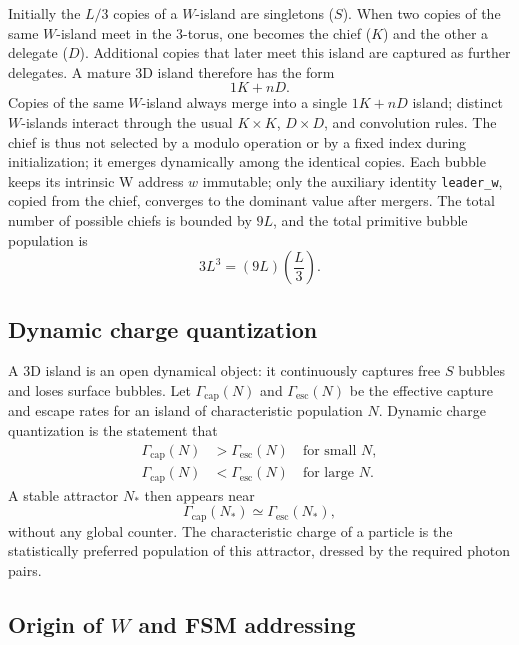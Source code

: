 \documentclass{ijuc}
\begin{document}
Initially the $L/3$ copies of a $W$-island are singletons ($S$). When two copies of the same $W$-island meet in the 3-torus, one becomes the chief ($K$) and the other a delegate ($D$). Additional copies that later meet this island are captured as further delegates. A mature 3D island therefore has the form
\begin{equation}
1K + nD.
\end{equation}
Copies of the same $W$-island always merge into a single $1K+nD$ island; distinct $W$-islands interact through the usual $K\times K$, $D\times D$, and convolution rules. The chief is thus not selected by a modulo operation or by a fixed index during initialization; it emerges dynamically among the identical copies. Each bubble keeps its intrinsic W address $w$ immutable; only the auxiliary identity \texttt{leader\_w}, copied from the chief, converges to the dominant value after mergers. The total number of possible chiefs is bounded by $9L$, and the total primitive bubble population is
\begin{equation}
3L^3 = (9L)\left(\frac{L}{3}\right).
\end{equation}

\subsection{Dynamic charge quantization}

A 3D island is an open dynamical object: it continuously captures free $S$ bubbles and loses surface bubbles. Let $\Gamma_{\mathrm{cap}}(N)$ and $\Gamma_{\mathrm{esc}}(N)$ be the effective capture and escape rates for an island of characteristic population $N$. Dynamic charge quantization is the statement that
\begin{align}
\Gamma_{\mathrm{cap}}(N) &> \Gamma_{\mathrm{esc}}(N) \quad \text{for small } N, \\
\Gamma_{\mathrm{cap}}(N) &< \Gamma_{\mathrm{esc}}(N) \quad \text{for large } N.
\end{align}
A stable attractor $N_*$ then appears near
\begin{equation}
\Gamma_{\mathrm{cap}}(N_*) \simeq \Gamma_{\mathrm{esc}}(N_*),
\end{equation}
without any global counter. The characteristic charge of a particle is the statistically preferred population of this attractor, dressed by the required photon pairs.

\subsection{Origin of $W$ and FSM addressing}
\end{document}
